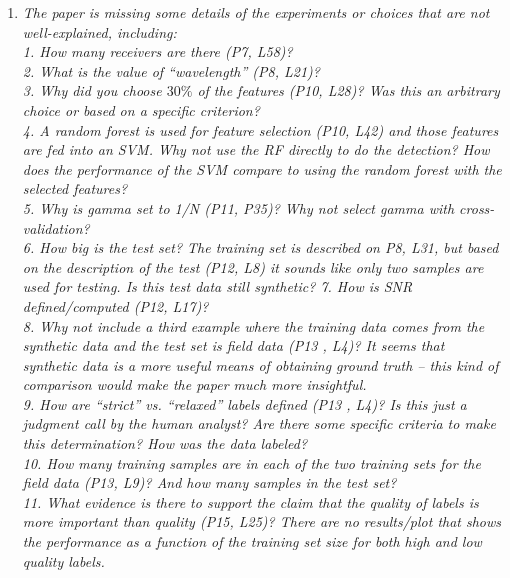 \begin{enumerate}
\item \textsl{The paper is missing some details of the experiments or choices that are not well-explained, including:\\
1. How many receivers are there (P7, L58)? \\
2. What is the value of “wavelength” (P8, L21)?  \\
3. Why did you choose $30\%$ of the features (P10, L28)? Was this an arbitrary choice or based on a specific criterion?  \\
4. A random forest is used for feature selection (P10, L42) and those features are fed into an SVM. Why not use the RF directly to do the detection? How does the performance of the SVM compare to using the random forest with the selected features?  \\
5. Why is gamma set to 1/N (P11, P35)? Why not select gamma with cross-validation? \\
6. How big is the test set? The training set is described on P8, L31, but based on the description of the test (P12, L8) it sounds like only two samples are used for testing. Is this test data still synthetic? 
7. How is SNR defined/computed (P12, L17)? \\
8. Why not include a third example where the training data comes from the synthetic data and the test set is field data (P13 , L4)? It seems that synthetic data is a more useful means of obtaining ground truth – this kind of comparison would make the paper much more insightful.  \\
9. How are “strict” vs. “relaxed” labels defined (P13 , L4)? Is this just a judgment call by the human analyst? Are there some specific criteria to make this determination? How was the data labeled?  \\
10. How many training samples are in each of the two training sets for the field data (P13, L9)? And how many samples in the test set?  \\
11. What evidence is there to support the claim that the quality of labels is more important than quality (P15, L25)? There are no results/plot that shows the performance as a function of the training set size for both high and low quality labels. }\\


\end{enumerate}
